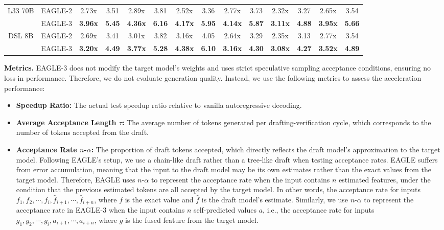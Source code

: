 \documentclass[11pt]{article}
\begin{document}
\begin{table}[h]
{\begin{tabular}{cccccccccccccc}
    \midrule
    \multirow{2}[2]{*}{L33 70B} & EAGLE-2 & 2.73x & 3.51  & 2.89x & 3.81  & 2.52x & 3.36  & 2.77x & 3.73  & 2.32x & 3.27  & 2.65x & 3.54 \\
          & EAGLE-3 & \textbf{3.96x} & \textbf{5.45} & \textbf{4.36x} & \textbf{6.16} & \textbf{4.17x} & \textbf{5.95} & \textbf{4.14x} & \textbf{5.87} & \textbf{3.11x} & \textbf{4.88} & \textbf{3.95x} & \textbf{5.66} \\
    \midrule
    \multirow{2}[2]{*}{DSL 8B} & EAGLE-2 & 2.69x & 3.41  & 3.01x & 3.82  & 3.16x & 4.05  & 2.64x & 3.29  & 2.35x & 3.13  & 2.77x & 3.54 \\
          & EAGLE-3 & \textbf{3.20x} & \textbf{4.49} & \textbf{3.77x} & \textbf{5.28} & \textbf{4.38x} & \textbf{6.10} & \textbf{3.16x} & \textbf{4.30} & \textbf{3.08x} & \textbf{4.27} & \textbf{3.52x} & \textbf{4.89} \\
    \bottomrule
    \end{tabular}%
    }
  \label{tab:experiments}%
\end{table}%

\textbf{Metrics.} EAGLE-3 does not modify the target model's weights and uses strict speculative sampling acceptance conditions, ensuring no loss in performance. Therefore, we do not evaluate generation quality. Instead, we use the following metrics to assess the acceleration performance:

\begin{itemize}
    \item \textbf{Speedup Ratio:} The actual test speedup ratio relative to vanilla autoregressive decoding.
    \item \textbf{Average Acceptance Length $\tau$:} The average number of tokens generated per drafting-verification cycle, which corresponds to the number of tokens accepted from the draft. 
    \item \textbf{Acceptance Rate $n$-$\alpha$:} The proportion of draft tokens accepted, which directly reflects the draft model's approximation to the target model. Following EAGLE's setup, we use a chain-like draft rather than a tree-like draft when testing acceptance rates. EAGLE suffers from error accumulation, meaning that the input to the draft model may be its own estimates rather than the exact values from the target model. Therefore, EAGLE uses $n$-$\alpha$ to represent the acceptance rate when the input contains $n$ estimated features, under the condition that the previous estimated tokens are all accepted by the target model. In other words, the acceptance rate for inputs $f_1,f_2,\cdots,f_i,\hat{f}_{i+1},\cdots,\hat{f}_{i+n}$, where $f$ is the exact value and $\hat{f}$ is the draft model’s estimate.  Similarly, we use $n$-$\alpha$ to represent the acceptance rate in EAGLE-3 when the input contains $n$ self-predicted values $a$, i.e., the acceptance rate for inputs $g_1,g_2,\cdots,g_i,{a}_{i+1},\cdots,{a}_{i+n}$, where $g$ is the fused feature from the target model.
    
\end{itemize}
\end{document}
